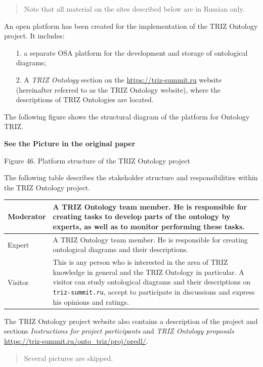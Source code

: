 \documentclass[11pt,a4paper]{article}
\newcommand{\addpicture}{\textbf{See the Picture in the original paper}\par}
\begin{document}
\begin{quote}
  Note that all material on the sites described below are in Russian only.
\end{quote}
An open platform has been created for the implementation of the TRIZ Ontology
project.  It includes:
\begin{itemize}[noitemsep]
\item[1.] a separate OSA platform for the development and storage of
  ontological diagrams;
\item[2.] A \emph{TRIZ Ontology} section on the \url{https://triz-summit.ru}
  website (hereinafter referred to as the TRIZ Ontology website), where the
  descriptions of TRIZ Ontologies are located.
\end{itemize}
The following figure shows the structural diagram of the platform for Ontology
TRIZ.
\begin{center}
  \addpicture
  Figure 46. Platform structure of the TRIZ Ontology project
\end{center}
The following table describes the stakeholder structure and responsibilities
within the TRIZ Ontology project.
\begin{center}
  \begin{tabular}{|l|p{12cm}|}\hline
    Moderator & A TRIZ Ontology team member. He is responsible for creating
    tasks to develop parts of the ontology by experts, as well as to monitor
    performing these tasks. \\\hline    
    Expert & A TRIZ Ontology team member. He is responsible for creating
    ontological diagrams and their descriptions. \\\hline    
    Visitor & This is any person who is interested in the area of TRIZ
    knowledge in general and the TRIZ Ontology in particular. A visitor can
    study ontological diagrams and their descriptions on
    \texttt{triz-summit.ru}, accept to participate in discussions and express
    his opinions and ratings. \\\hline
  \end{tabular}
\end{center}
The TRIZ Ontology project website also contains a description of the project
and sections \emph{Instructions for project participants} and \emph{TRIZ
Ontology proposals}  \url{https://triz-summit.ru/onto_triz/proj/predl/}.

\begin{quote}
  Several pictures are skipped.
\end{quote}
\end{document}
